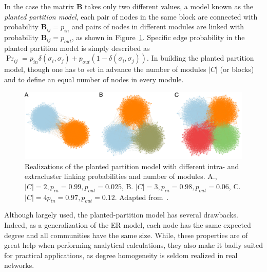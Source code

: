 \documentclass[11pt,              a4paper,              twoside,openright,              titlepage,              headinclude,footinclude,                            numbers=noenddot,              cleardoublepage=empty,]{scrreprt}
\begin{document}
In the case the matrix $\mathbf{B}$ takes only two different values, a model known as the \emph{planted partition model}, each pair of nodes in the same block are connected with probability $\mathbf{B}_{ij}=p_{in}$ and pairs of nodes in different modules are linked with probability $\mathbf{B}_{ij}=p_{out}$, as shown in Figure~\ref{fig:planted_peixoto}.
Specific edge probability in the planted partition model is simply described as $\Pr_{ij} = p_{in}\delta(\sigma_i,\sigma_j) + p_{out}(1-\delta(\sigma_i,\sigma_j))$.
In building the planted partition model, though one has to set in advance the number of modules $|C|$ (or blocks) and to define an equal number of nodes in every module.

\begin{figure}[htb!]
\centering
\includegraphics[width=1.0\textwidth]{images/peixoto_block_models.pdf}
\caption{Realizations of the planted partition model with different intra- and extracluster linking probabilities and number of modules.
A., $|C|=2, p_{in}=0.99, p_{out}=0.025$, B.
$|C|=3, p_{in}=0.98, p_{out}=0.06$, C.
$|C|=4 p_{in}=0.97, p_{out}=0.12$.
Adapted from~\cite{peixoto2015}.}
\label{fig:planted_peixoto}
\end{figure}

Although largely used, the planted-partition model has several drawbacks.
Indeed, as a generalization of the ER model, each node has the same expected degree and all communities have the same size.
While, these properties are of great help when performing analytical calculations, they also make it badly suited for practical applications, as degree homogeneity is seldom realized in real networks.
\end{document}
